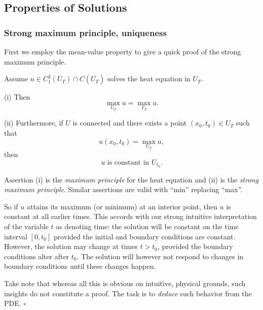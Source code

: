 \subsection{Properties of Solutions}
\label{sec:heat-properties-of-solutions}

\subsubsection{Strong maximum principle, uniqueness}
\label{sec:heat-strong-maximum-principle}

First we employ the mean-value property to give a quick proof of the strong maximum principle.

\begin{theorem}
\label{thm:strong-maximum-principle-heat-equation}
Assume $u \in C^2_1(U_T) \cap C(\overline{U_T})$ solves the heat equation in $U_T$.

(i) Then
$$\max_{U_T} u = \max_{\Gamma_T} u.$$

\begin{figure}[h]\centering
\end{figure}

(ii) Furthermore, if $U$ is connected and there exists a point $(x_0, t_0) \in U_T$ such that
$$u(x_0, t_0) = \max_{U_T} u,$$
then
$$u \text{ is constant in } U_{t_0}.$$
\end{theorem}

Assertion (i) is the \textit{maximum principle} for the heat equation and (ii) is the \textit{strong maximum principle}. Similar assertions are valid with ``min'' replacing ``max''.

\begin{remark}
\label{rem:strong-maximum-principle-heat-time-intuition}
So if $u$ attains its maximum (or minimum) at an interior point, then $u$ is constant at all earlier times. This accords with our strong intuitive interpretation of the variable $t$ as denoting time: the solution will be constant on the time interval $[0, t_0]$ provided the initial and boundary conditions are constant. However, the solution may change at times $t > t_0$, provided the boundary conditions alter after $t_0$. The solution will however not respond to changes in boundary conditions until these changes happen.

Take note that whereas all this is obvious on intuitive, physical grounds, such insights do not constitute a proof. The task is to \textit{deduce} such behavior from the PDE. $\square$
\end{remark}


